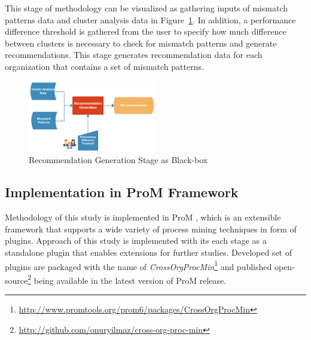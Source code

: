 This stage of methodology can be visualized as gathering inputs of mismatch patterns data and cluster analysis data in Figure~\ref{fig:recommendation-generation-blackox}. In addition, a performance difference threshold is gathered from the user to specify how much difference between clusters is necessary to check for mismatch patterns and generate recommendations. This stage generates recommendation data for each organization that contains a set of mismatch patterns.
\begin{figure}
  \centering
  \includegraphics[width=0.5\textwidth]{4_methodology/recommendation-generation-blackbox}
  \caption{Recommendation Generation Stage as Black-box}
  \label{fig:recommendation-generation-blackox}
\end{figure}

\subsection{Implementation in ProM Framework}
\label{subsec:implementation}
Methodology of this study is implemented in ProM \cite{verbeek2010prom}, which is an extensible framework that supports a wide variety of process mining techniques in form of plugins. Approach of this study is implemented with its each stage as a standalone plugin that enables extensions for further studies. Developed set of plugins are packaged with the name of \textit{CrossOrgProcMin}\footnote{\url{http://www.promtools.org/prom6/packages/CrossOrgProcMin}} and published open-source\footnote{\url{http://github.com/onuryilmaz/cross-org-proc-min}} being available in the latest version of ProM release.